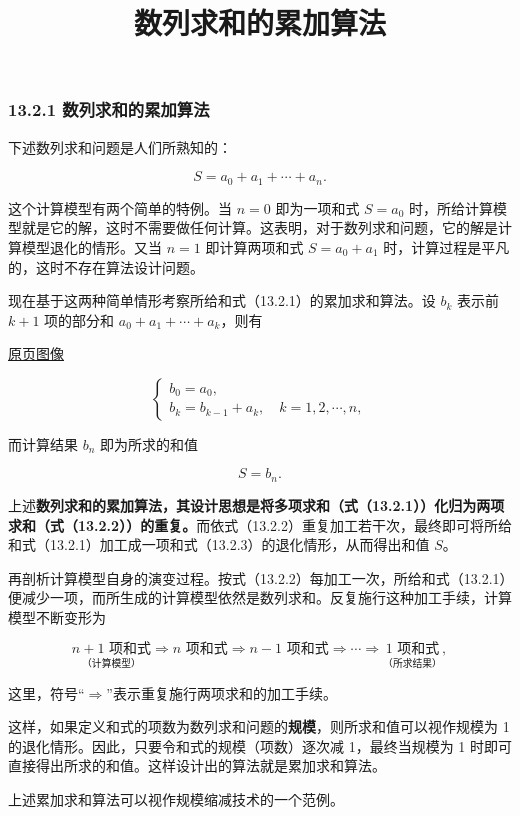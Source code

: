 \documentclass[
  10pt,
  fontset=fandol]{ctexart}
\title{数列求和的累加算法}
\author{}
\date{}
\begin{document}
\maketitle

\subsubsection{13.2.1 数列求和的累加算法}\label{ux6570ux5217ux6c42ux548cux7684ux7d2fux52a0ux7b97ux6cd5}

下述数列求和问题是人们所熟知的：

\[
S=a_0+a_1+\cdots+a_n.
\tag{13.2.1}
\]

这个计算模型有两个简单的特例。当 \(n=0\) 即为一项和式 \(S=a_0\) 时，所给计算模型就是它的解，这时不需要做任何计算。这表明，对于数列求和问题，它的解是计算模型退化的情形。又当 \(n=1\) 即计算两项和式 \(S=a_0+a_1\) 时，计算过程是平凡的，这时不存在算法设计问题。

现在基于这两种简单情形考察所给和式（13.2.1）的累加求和算法。设 \(b_k\) 表示前 \(k+1\) 项的部分和 \(a_0+a_1+\cdots+a_k\)，则有

\href{../../source-images/pdf-309.jpeg}{原页图像}

\[
\begin{cases}
b_0=a_0,\\
b_k=b_{k-1}+a_k,\quad k=1,2,\cdots,n,
\end{cases}
\tag{13.2.2}
\]

而计算结果 \(b_n\) 即为所求的和值

\[
S=b_n.
\tag{13.2.3}
\]

上述\textbf{数列求和的累加算法，其设计思想是将多项求和（式（13.2.1））化归为两项求和（式（13.2.2））的重复。}而依式（13.2.2）重复加工若干次，最终即可将所给和式（13.2.1）加工成一项和式（13.2.3）的退化情形，从而得出和值 \(S\)。

再剖析计算模型自身的演变过程。按式（13.2.2）每加工一次，所给和式（13.2.1）便减少一项，而所生成的计算模型依然是数列求和。反复施行这种加工手续，计算模型不断变形为

\[
\underset{\text{（计算模型）}}{n+1\text{ 项和式}}
\Rightarrow n\text{ 项和式}
\Rightarrow n-1\text{ 项和式}
\Rightarrow\cdots\Rightarrow
\underset{\text{（所求结果）}}{1\text{ 项和式}},
\]

这里，符号``\(\Rightarrow\)''表示重复施行两项求和的加工手续。

这样，如果定义和式的项数为数列求和问题的\textbf{规模}，则所求和值可以视作规模为 1 的退化情形。因此，只要令和式的规模（项数）逐次减 1，最终当规模为 1 时即可直接得出所求的和值。这样设计出的算法就是累加求和算法。

上述累加求和算法可以视作规模缩减技术的一个范例。
\end{document}
